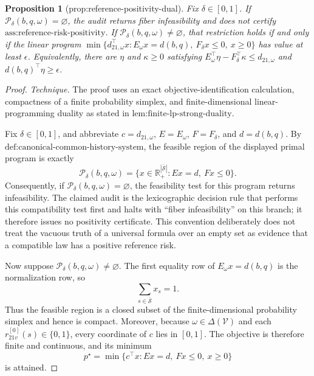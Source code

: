 \documentclass{article}
\newtheorem{proposition}{Proposition}
\begin{document}
\begin{proposition}[prop:reference-positivity-dual]\label{prop:reference-positivity-dual}
Fix \(\delta\in[0,1]\). If \(\mathcal P_\delta(b,q,\omega)=\varnothing\), the audit returns fiber infeasibility and does not certify \(\text{ass:reference-risk-positivity}\). If \(\mathcal P_\delta(b,q,\omega)\neq\varnothing\), that restriction holds if and only if the linear program \(\min\{d_{21,\omega}^{\top}x:E_\omega x=d(b,q),\ F_\delta x\leq0,\ x\geq0\}\) has value at least \(\epsilon\). Equivalently, there are \(\eta\) and \(\kappa\geq0\) satisfying \(E_\omega^{\top}\eta-F_\delta^{\top}\kappa\leq d_{21,\omega}\) and \(d(b,q)^{\top}\eta\geq\epsilon\).
\end{proposition}
\begin{proof}
\emph{Technique.}  The proof uses an exact objective-identification calculation, compactness of a finite probability simplex, and finite-dimensional linear-programming duality as stated in \(\text{lem:finite-lp-strong-duality}\).

Fix \(\delta\in[0,1]\), and abbreviate \(c=d_{21,\omega}\), \(E=E_\omega\), \(F=F_\delta\), and \(d=d(b,q)\).  By \(\text{def:canonical-common-history-system}\), the feasible region of the displayed primal program is exactly
\[
 \mathcal P_\delta(b,q,\omega)
 =\{x\in\mathbb R_+^{|\overline{\mathcal S}|}:Ex=d,\ Fx\leq0\}.
\]
Consequently, if \(\mathcal P_\delta(b,q,\omega)=\varnothing\), the feasibility test for this program returns infeasibility.  The claimed audit is the lexicographic decision rule that performs this compatibility test first and halts with ``fiber infeasibility'' on this branch; it therefore issues no positivity certificate.  This convention deliberately does not treat the vacuous truth of a universal formula over an empty set as evidence that a compatible law has a positive reference risk.

Now suppose \(\mathcal P_\delta(b,q,\omega)\neq\varnothing\).  The first equality row of \(E_\omega x=d(b,q)\) is the normalization row, so
\[
 \sum_{s\in\overline{\mathcal S}}x_s=1.
\]
Thus the feasible region is a closed subset of the finite-dimensional probability simplex and hence is compact.  Moreover, because \(\omega\in\Delta(\mathcal V)\) and each \(r^{[0]}_{21v}(s)\in\{0,1\}\), every coordinate of \(c\) lies in \([0,1]\).  The objective is therefore finite and continuous, and its minimum
\[
 p^\star=\min\{c^\top x:Ex=d,\ Fx\leq0,\ x\geq0\}
\]
is attained.


\end{proof}
\end{document}
